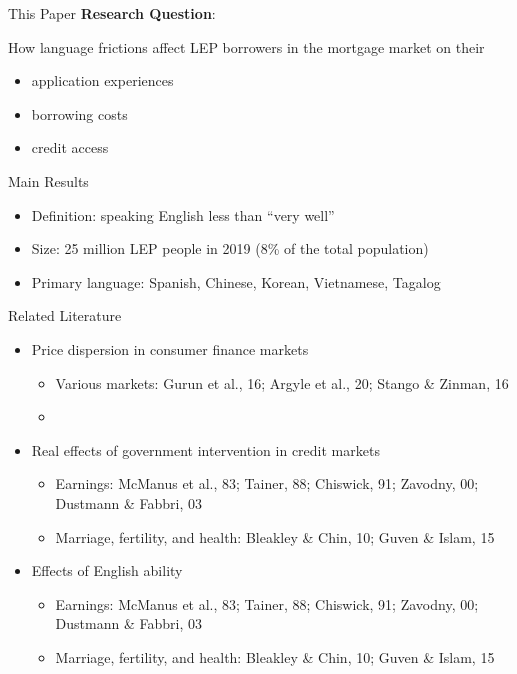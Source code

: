 \documentclass[aspectratio=169,11pt]{beamer}
\begin{document}
\begin{frame}{This Paper}
\textbf{Research Question}: 

How language frictions affect LEP borrowers in the mortgage market on their
\begin{itemize}
    \item application experiences
    \item borrowing costs
    \item credit access
\end{itemize}
\pause

\end{frame}

\begin{frame}{Main Results}
\begin{itemize}
    \item Definition: speaking English less than ``very well''
    \item Size: 25 million LEP people in 2019 (8\% of the total population)
    \item Primary language: Spanish, Chinese, Korean, Vietnamese, Tagalog
\end{itemize}
\end{frame}

\begin{frame}{Related Literature}
\begin{itemize}
    \item Price dispersion in consumer finance markets
    \begin{itemize}
        \item Various markets: {\footnotesize \color{darkgray}Gurun et al., 16; Argyle et al., 20; Stango \& Zinman, 16}
        \item 
    \end{itemize}
    \item Real effects of government intervention in credit markets
    \begin{itemize}
        \item Earnings: {\footnotesize \color{darkgray} McManus et al., 83; Tainer, 88; Chiswick, 91; Zavodny, 00; Dustmann \& Fabbri, 03}
        \item Marriage, fertility, and health: {\footnotesize \color{darkgray}Bleakley \& Chin, 10; Guven \& Islam, 15}
    \end{itemize}
    \item Effects of English ability
    \begin{itemize}
        \item Earnings: {\footnotesize \color{darkgray} McManus et al., 83; Tainer, 88; Chiswick, 91; Zavodny, 00; Dustmann \& Fabbri, 03}
        \item Marriage, fertility, and health: {\footnotesize \color{darkgray}Bleakley \& Chin, 10; Guven \& Islam, 15}
    \end{itemize}
\end{itemize}
\end{frame}
\end{document}
